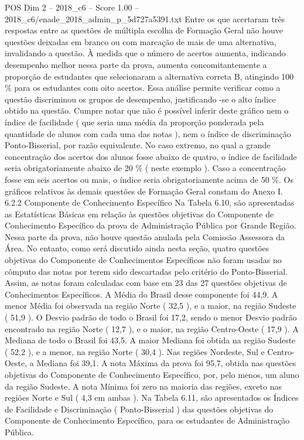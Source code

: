 \begin{textsample}{POS Dim 2 – 2018\_c6 – Score 1.00 – 2018\_c6/enade\_2018\_admin\_p\_5d727a5391.txt}
Entre os que acertaram três respostas entre as questões de múltipla escolha de Formação Geral não houve questões deixadas em branco ou com marcação de mais de uma alternativa, invalidando a questão.
À medida que o número de acertos aumenta, indicando desempenho melhor nessa parte da prova, aumenta concomitantemente a proporção de estudantes que selecionaram a alternativa correta B, atingindo 100 \% para os estudantes com oito acertos.
Essa análise permite verificar como a questão discriminou os grupos de desempenho, justificando -se o alto índice obtido na questão.
Cumpre notar que não é possível inferir deste gráfico nem o índice de facilidade ( que seria uma média da proporção ponderada pela quantidade de alunos com cada uma das notas ), nem o índice de discriminação Ponto-Bisserial, por razão equivalente.
No caso extremo, no qual a grande concentração dos acertos dos alunos fosse abaixo de quatro, o índice de facilidade seria obrigatoriamente abaixo de 20 \% ( neste exemplo ).
Caso a concentração fosse em seis acertos ou mais, o índice seria obrigatoriamente acima de 50 \%.
Os gráficos relativos às demais questões de Formação Geral constam do Anexo I. 6.2.2 Componente de Conhecimento Específico Na Tabela 6.10, são apresentadas as Estatísticas Básicas em relação às questões objetivas do Componente de Conhecimento Específico da prova de Administração Pública por Grande Região.
Nessa parte da prova, não houve questão anulada pela Comissão Assessora da Área.
No entanto, como será discutido ainda nesta seção, quatro questões objetivas do Componente de Conhecimentos Específicos não foram usadas no cômputo das notas por terem sido descartadas pelo critério do Ponto-Bisserial.
Assim, as notas foram calculadas com base em 23 das 27 questões objetivas de Conhecimentos Específicos.
A Média do Brasil desse componente foi 44,9.
A menor Média foi observada na região Norte ( 32,5 ), e a maior, na região Sudeste ( 51,9 ).
O Desvio padrão de todo o Brasil foi 17,2, sendo o menor Desvio padrão encontrado na região Norte ( 12,7 ), e o maior, na região Centro-Oeste ( 17,9 ).
A Mediana de todo o Brasil foi 43,5.
A maior Mediana foi obtida na região Sudeste ( 52,2 ), e a menor, na região Norte ( 30,4 ).
Nas regiões Nordeste, Sul e Centro-Oeste, a Mediana foi 39,1.
A nota Máxima da prova foi 95,7, obtida nas questões objetivas do Componente de Conhecimento Específico, por, pelo menos, um aluno da região Sudeste.
A nota Mínima foi zero na maioria das regiões, exceto nas regiões Norte e Sul ( 4,3 em ambas ).
Na Tabela 6.11, são apresentados os Índices de Facilidade e Discriminação ( Ponto-Bisserial ) das questões objetivas do Componente de Conhecimento Específico, para os estudantes de Administração Pública.

\end{textsample}
